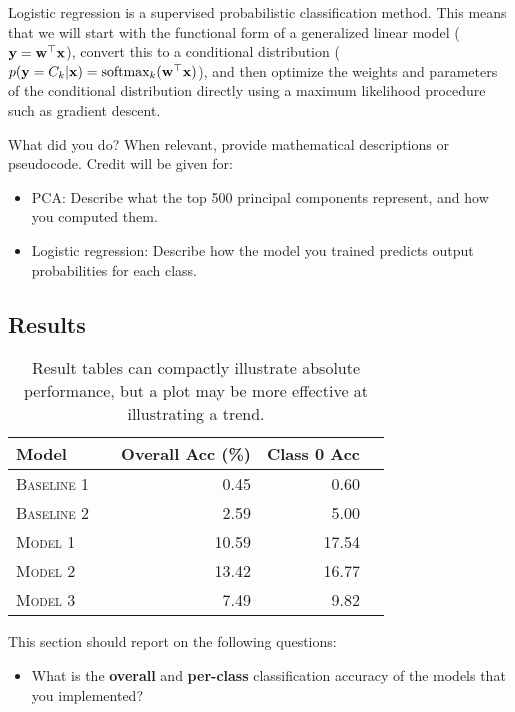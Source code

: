 \documentclass[11pt]{article}
\begin{document}
\noindent Logistic regression is a supervised probabilistic classification method. This means that we will start with the functional form of a generalized linear model ($\mathbf{y} = \mathbf{w}^\top \mathbf{x}$), convert this to a conditional distribution ($p(\mathbf{y}=C_k | \mathbf{x}) = \text{softmax}_k(\mathbf{w}^\top \mathbf{x})$), and then optimize the weights and parameters of the conditional distribution directly using a maximum likelihood procedure such as gradient descent.

\newpage

What did you do? When relevant, provide mathematical descriptions or pseudocode. Credit will be given for:

  \begin{itemize}
  \item PCA:  Describe what the top 500 principal components represent, and how you computed them.
  \item Logistic regression: Describe how the model you trained predicts output probabilities for each class.

  \end{itemize}

\subsection{Results}

\begin{table}
\centering
\begin{tabular}{llrrr}
 \toprule
 Model &  & Overall Acc (\%) & Class 0 Acc \\
 \midrule
 \textsc{Baseline 1} & & 0.45 & 0.60\\
 \textsc{Baseline 2} & & 2.59 & 5.00\\
 \textsc{Model 1} & & 10.59 & 17.54\\
 \textsc{Model 2} & &13.42 & 16.77\\
 \textsc{Model 3} & & 7.49 & 9.82\\
 \bottomrule
\end{tabular}
\caption{\label{tab:results} Result tables can compactly illustrate absolute performance, but a plot may be more effective at illustrating a trend.}
\end{table}

This section should report on the following questions: 

\begin{itemize}
\item  What is the \textbf{overall} and \textbf{per-class} classification accuracy of the models that you implemented?
\end{itemize}
\end{document}
